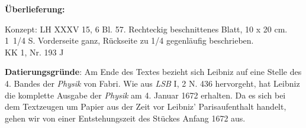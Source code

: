       
               
                \begin{ledgroupsized}[r]{120mm}
                \footnotesize 
                \pstart                
                \noindent\textbf{\"{U}berlieferung:}   
                \pend
                \end{ledgroupsized}
            
              
                            \begin{ledgroupsized}[r]{114mm}
                            \footnotesize 
                            \pstart \parindent -6mm
                            Konzept: LH XXXV 15, 6 Bl. 57. Rechteckig beschnittenes Blatt, 10 x 20 cm. 1~1/4 S. Vorderseite ganz, R\"{u}ckseite zu 1/4 gegenl\"{a}ufig beschrieben.\\KK 1, Nr. 193 J \pend
                            \end{ledgroupsized}
                \vspace*{5mm}
                \begin{ledgroup}
                \footnotesize 
                \pstart
            \noindent\footnotesize{\textbf{Datierungsgr\"{u}nde}: Am Ende des Textes bezieht sich Leibniz auf eine Stelle des 4. Bandes der \cite{00044}\textit{Physik} von Fabri. Wie aus \textit{LSB} I, 2 N. 436 hervorgeht, hat Leibniz die komplette Ausgabe der \cite{00044}\textit{Physik} am 4. Januar 1672 erhalten. Da es sich bei dem Textzeugen um Papier aus der Zeit vor Leibniz' Parisaufenthalt handelt, gehen wir von einer Entstehungszeit des St\"{u}ckes Anfang 1672 aus.}
                \pend
                \end{ledgroup}
            
